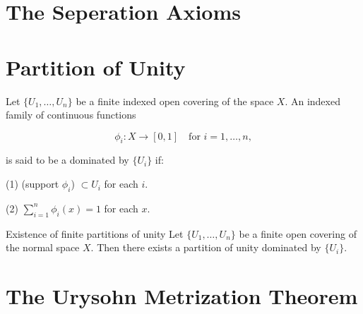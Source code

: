 \documentclass[../main.tex]{subfiles}
\begin{document}
\section{The Seperation Axioms}

\section{Partition of Unity}

\begin{definition}{}{}
Let $\{U_1, \ldots, U_n\}$ be a finite indexed open covering of the space $X$. An indexed family of continuous functions

\[
\phi_i : X \longrightarrow [0, 1] \quad \text{for } i = 1, \ldots, n,
\]

is said to be a  dominated by $\{U_i\}$ if:

(1) (support $\phi_i$) $\subset U_i$ for each $i$.

(2) $\sum_{i=1}^n \phi_i(x) = 1$ for each $x$.
\end{definition}

\begin{theorem}{Existence of finite partitions of unity}{}
Let $\{U_1, \ldots, U_n\}$ be a finite open covering of the normal space $X$. Then there exists a partition of unity dominated by $\{U_i\}$.
\end{theorem}

\section{ The Urysohn Metrization Theorem}
\end{document}
